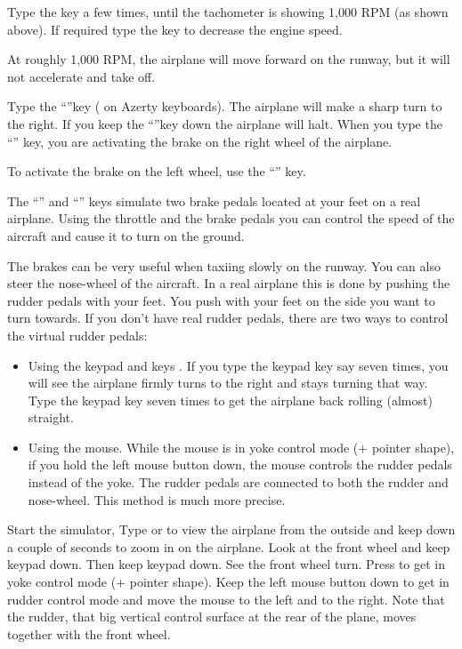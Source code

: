 Type the  key a few times,
until the tachometer is showing 1,000 RPM (as shown above). If required
type the  key to decrease the engine speed.

At roughly 1,000 RPM, the airplane will move forward on the runway, but it will
not accelerate and take off.

 Type the ``''key ( on
Azerty keyboards). The airplane will make a sharp turn to the right. If you
keep the ``''key down the airplane will halt. When you type the
``'' key, you are activating the brake on the right wheel of the
airplane.

 To activate the brake on the left
wheel, use the ``\key{,}'' key.

 The ``\key{,}'' and ``''  keys simulate two brake pedals
located at your feet on a real airplane. Using the throttle and the brake pedals
you can control the speed of the aircraft and cause it to turn on the ground.

The brakes can be very useful when taxiing slowly on the runway. You can also
steer the nose-wheel of the aircraft. In a real airplane this is done by pushing
the rudder pedals with your feet. You push with your feet on the side you want
to turn towards. If you don't have real rudder pedals, there are two ways to
control the virtual rudder pedals:
\begin{itemize}
    \item Using the keypad   and  keys
  . If you type the keypad  key say
  seven times, you will see the airplane firmly turns to the right and
  stays turning that way. Type the keypad  key seven times to get the
  airplane back rolling (almost) straight.
    \item Using the mouse. While the mouse is in yoke control mode
  ($+$ pointer shape), if you hold the left mouse button down, the mouse
  controls the rudder pedals instead of the yoke. The rudder pedals are
  connected to both the rudder 
   and nose-wheel. This method is much more precise.
\end{itemize}

Start the simulator, Type  or  to view the airplane from
the outside and keep  down a couple of seconds to zoom in on the
airplane. Look at the front wheel and keep keypad  down. Then
keep keypad  down. See the front wheel turn. Press 
to get in yoke control mode ($+$ pointer shape).
Keep the left mouse button down to get in rudder control mode and move
the mouse to the left and to the right. Note that the rudder, that big
vertical control surface at the rear of the plane, moves together with
the front wheel.

